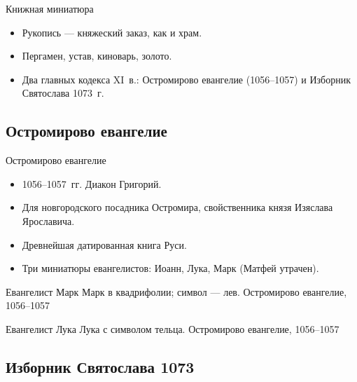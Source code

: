 \begin{frame}{Книжная миниатюра}
  \begin{itemize}
    \item Рукопись --- княжеский заказ, как и храм.
    \item Пергамен, устав, киноварь, золото.
    \item Два главных кодекса XI~в.: Остромирово евангелие
          (1056--1057) и Изборник Святослава 1073~г.
  \end{itemize}
\end{frame}

\subsection{Остромирово евангелие}

\begin{frame}{Остромирово евангелие}
  \begin{itemize}
    \item 1056--1057~гг. Диакон Григорий.
    \item Для новгородского посадника Остромира,
          свойственника князя Изяслава Ярославича.
    \item Древнейшая датированная книга Руси.
    \item Три миниатюры евангелистов: Иоанн, Лука, Марк
          (Матфей утрачен).
  \end{itemize}
\end{frame}

\begin{frame}{Евангелист Марк}
    {Марк в квадрифолии; символ --- лев.
     Остромирово евангелие, 1056--1057}
\end{frame}

\begin{frame}{Евангелист Лука}
    {Лука с символом тельца.
     Остромирово евангелие, 1056--1057}
\end{frame}

\subsection{Изборник Святослава 1073}

